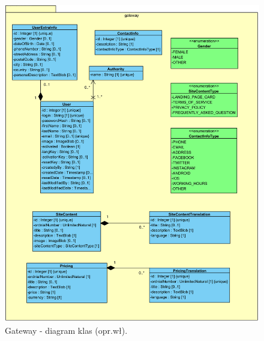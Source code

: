\begin{minipage}{\textwidth}
    \begin{figure}[H]
        \centering\includegraphics[scale=0.7]{../uml/class_diagrams/gateway.png}
        \caption{Gateway - diagram klas (opr.wł).}\label{rysunek:class-diagram-gateway}
    \end{figure}
\end{minipage}

